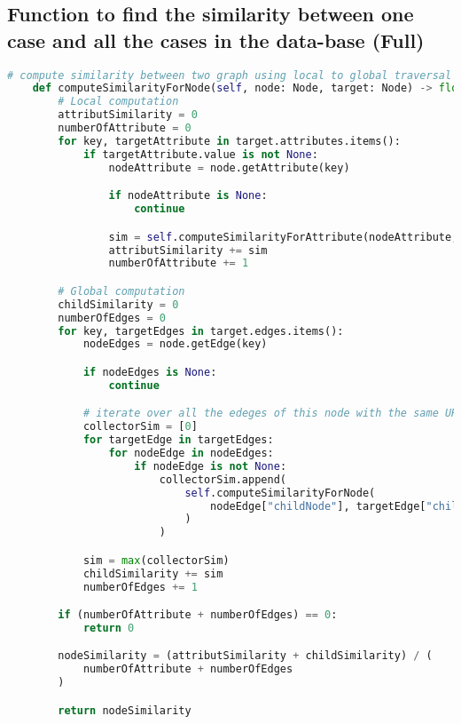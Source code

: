\subsection{Function to find the similarity between one case and all the cases in the data-base (Full)\label{annex:comp-sim-node-full}}
\begin{lstlisting}[language=Python, caption=Function to find the similarity between one case and all the cases in the data-base (Full), label={lst:comp-sim-node-all}]
# compute similarity between two graph using local to global traversal
    def computeSimilarityForNode(self, node: Node, target: Node) -> float:
        # Local computation
        attributSimilarity = 0
        numberOfAttribute = 0
        for key, targetAttribute in target.attributes.items():
            if targetAttribute.value is not None:
                nodeAttribute = node.getAttribute(key)

                if nodeAttribute is None:
                    continue

                sim = self.computeSimilarityForAttribute(nodeAttribute, targetAttribute)
                attributSimilarity += sim
                numberOfAttribute += 1

        # Global computation
        childSimilarity = 0
        numberOfEdges = 0
        for key, targetEdges in target.edges.items():
            nodeEdges = node.getEdge(key)

            if nodeEdges is None:
                continue

            # iterate over all the edeges of this node with the same URI
            collectorSim = [0]
            for targetEdge in targetEdges:
                for nodeEdge in nodeEdges:
                    if nodeEdge is not None:
                        collectorSim.append(
                            self.computeSimilarityForNode(
                                nodeEdge["childNode"], targetEdge["childNode"]
                            )
                        )

            sim = max(collectorSim)
            childSimilarity += sim
            numberOfEdges += 1

        if (numberOfAttribute + numberOfEdges) == 0:
            return 0

        nodeSimilarity = (attributSimilarity + childSimilarity) / (
            numberOfAttribute + numberOfEdges
        )

        return nodeSimilarity
\end{lstlisting}


